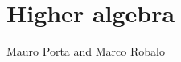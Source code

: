\chapter*{Higher algebra}
\begin{flushright}
  Mauro Porta and Marco Robalo
\end{flushright}

\begin{refsection}
\printbibliography[heading = local]

\end{refsection}


